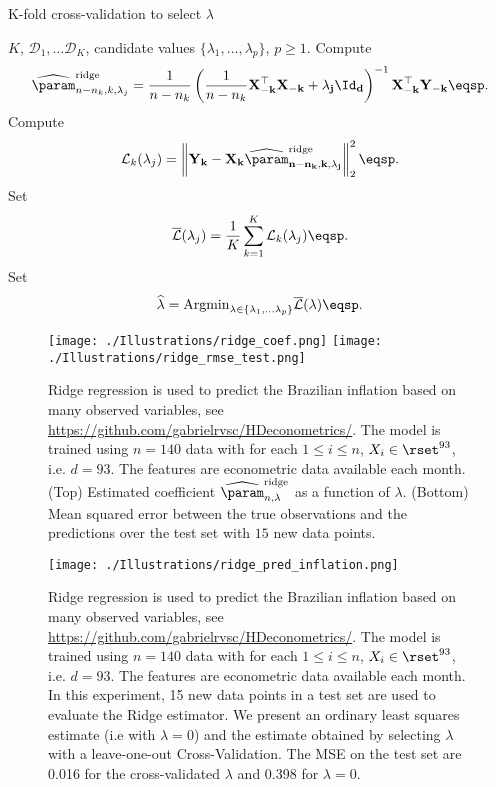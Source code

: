 \begin{algorithm}
\caption{K-fold cross-validation to select $\lambda$}\label{alg:cv:ridge}
\begin{algorithmic}
\Require $K$, $\mathcal{D}_1, \ldots \mathcal{D}_K$, candidate values $\{\lambda_1,\ldots,\lambda_p\}$, $p\geqslant 1$.
    \State Compute
$$
\widehat \param^{\mathrm{ridge}}_{n-n_k,k,\lambda_j} = \frac{1}{n-n_k}\left(\frac{1}{n-n_k}\bf{X}_{-k}^\top \bf{X}_{-k} + \lambda_j \Id_d\right)^{-1}\bf{X}_{-k}^\top \bf{Y}_{-k}\eqsp.
$$
    \State Compute
$$
\mathcal{L}_k(\lambda_j) = \left\|\bf{Y}_k - \bf{X}_k \widehat \param^{\mathrm{ridge}}_{n-n_k,k,\lambda_j}\right\|_2^2\eqsp.
$$ 
\EndFor
\State Set
$$
\overline{\mathcal{L}}(\lambda_j) = \frac{1}{K}\sum_{k=1}^{K}\mathcal{L}_k(\lambda_j)\eqsp.
$$
\EndFor
\State Set
$$
\widehat \lambda = \mathrm{Argmin}_{\lambda\in\{\lambda_1,\ldots\lambda_p\}}\overline{\mathcal{L}}(\lambda)\eqsp.
$$
\end{algorithmic}
\end{algorithm}
\begin{figure}
\begin{center}
\texttt{[image: ./Illustrations/ridge\_coef.png]}
\texttt{[image: ./Illustrations/ridge\_rmse\_test.png]}
\end{center}
\caption{Ridge regression is used to predict the Brazilian inflation based on many observed variables, see \url{https://github.com/gabrielrvsc/HDeconometrics/}. The model is trained using $n=140$ data with for each $1\leqslant i \leqslant n$, $X_i\in\rset^{93}$, i.e. $d  =93$. The features are econometric data available each month. (Top) Estimated coefficient $\widehat \param^{\mathrm{ridge}}_{n,\lambda}$ as a function of $\lambda$. (Bottom) Mean squared error between the true observations and the predictions over the test set with $15$ new data points.}
\end{figure}


\begin{figure}
\begin{center}
\texttt{[image: ./Illustrations/ridge\_pred\_inflation.png]}
\end{center}
\caption{Ridge regression is used to predict the Brazilian inflation based on many observed variables, see \url{https://github.com/gabrielrvsc/HDeconometrics/}. The model is trained using $n=140$ data with for each $1\leqslant i \leqslant n$, $X_i\in\rset^{93}$, i.e. $d  =93$. The features are econometric data available each month. In this experiment, 15 new data points in a test set are used to evaluate the Ridge estimator. We present an ordinary least squares estimate (i.e with $\lambda = 0$) and the estimate obtained by selecting $\lambda$ with a leave-one-out Cross-Validation. The MSE on the test set are 0.016 for the cross-validated $\lambda$ and 0.398 for $\lambda = 0$.}
\end{figure}



